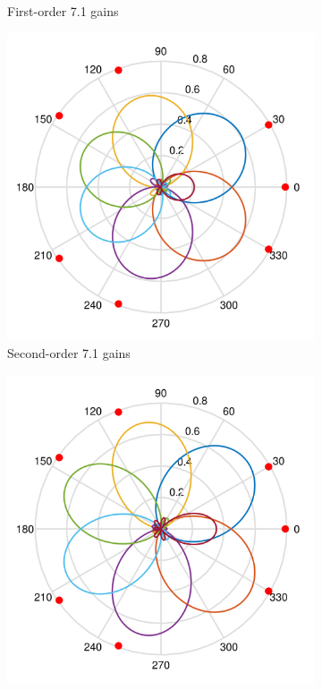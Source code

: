 \documentclass[12pt]{report}
\begin{document}
\begin{figure}[tbp]
\begin{subfigure}{0.32\textwidth}
    \caption{\centering First-order 7.1 gains}
  \end{subfigure}
  \hfill
    \begin{subfigure}{0.32\textwidth}
    \includegraphics[width=\linewidth]{figures/ldspkGains_7p0_o2.png}
    \caption{\centering Second-order 7.1 gains}
  \end{subfigure}
  \hfill
  \begin{subfigure}{0.32\textwidth}
    \includegraphics[width=\linewidth]{figures/ldspkGains_7p0_o3.png}

\end{subfigure}
\end{figure}
\end{document}
